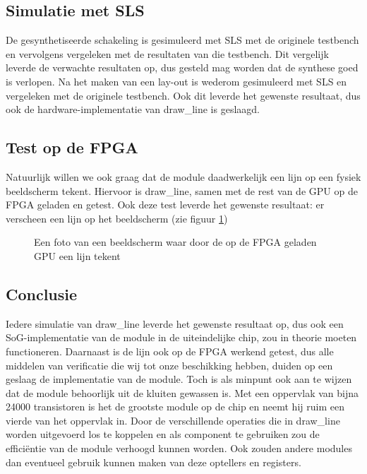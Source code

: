 \documentclass{scrartcl} %
\begin{document}
\subsection{Simulatie met SLS}
De gesynthetiseerde schakeling is gesimuleerd met SLS met de originele testbench en vervolgens vergeleken met de resultaten van die testbench. Dit vergelijk leverde de verwachte resultaten op, dus gesteld mag worden dat de synthese goed is verlopen. Na het maken van een lay-out is wederom gesimuleerd met SLS en vergeleken met de originele testbench. Ook dit leverde het gewenste resultaat, dus ook de hardware-implementatie van draw\_line is geslaagd.

\subsection{Test op de FPGA}
Natuurlijk willen we ook graag dat de module daadwerkelijk een lijn op een fysiek beeldscherm tekent. Hiervoor is draw\_line, samen met de rest van de GPU op de FPGA geladen en getest. Ook deze test leverde het gewenste resultaat: er verscheen een lijn op het beeldscherm (zie figuur \ref{fig:draw-line-fpga})

\begin{figure}[H]
	\centering
	\caption{Een foto van een beeldscherm waar door de op de FPGA geladen GPU een lijn tekent}
	\label{fig:draw-line-fpga}
\end{figure}

\subsection{Conclusie}
Iedere simulatie van draw\_line leverde het gewenste resultaat op, dus ook een SoG-implementatie van de module in de uiteindelijke chip, zou in theorie moeten functioneren. Daarnaast is de lijn ook op de FPGA werkend getest, dus alle middelen van verificatie die wij tot onze beschikking hebben, duiden op een geslaag de implementatie van de module. Toch is als minpunt ook aan te wijzen dat de module behoorlijk uit de kluiten gewassen is. Met een oppervlak van bijna 24000 transistoren is het de grootste module op de chip en neemt hij ruim een vierde van het oppervlak in. Door de verschillende operaties die in draw\_line worden uitgevoerd los te koppelen en als component te gebruiken zou de efficiëntie van de module verhoogd kunnen worden. Ook zouden andere modules dan eventueel gebruik kunnen maken van deze optellers en registers.
\end{document}

